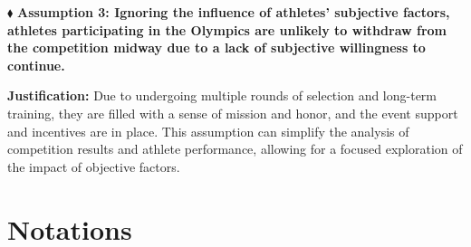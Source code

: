 \documentclass{mcmthesis}
\begin{document}
$  \blacklozenge $  {\bf Assumption 3: Ignoring the influence of athletes' subjective factors, athletes participating in the Olympics are unlikely to withdraw from the competition midway due to a lack of subjective willingness to continue.}

{\bf Justification:} Due to undergoing multiple rounds of selection and long-term training, they are filled with a sense of mission and honor, and the event support and incentives are in place. This assumption can simplify the analysis of competition results and athlete performance, allowing for a focused exploration of the impact of objective factors.

\section{Notations}
\end{document}
